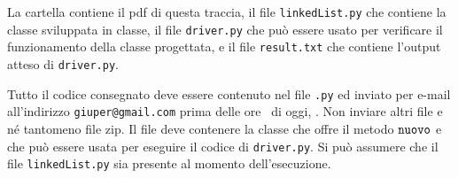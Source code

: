 \documentclass{amsart}
\begin{document}
\medskip{}
La cartella contiene il pdf di questa traccia, il file
{\tt linkedList.py} che contiene la classe sviluppata in classe,
il file {\tt driver.py} che pu\`o essere usato
per verificare il funzionamento della classe progettata, e il file  {\tt result.txt} che contiene
l'output atteso di {\tt driver.py}.

\medskip{}
Tutto il codice consegnato deve essere contenuto nel file
{\tt \nomeClasse .py} ed inviato per e-mail all'indirizzo
{\tt giuper@gmail.com} prima delle ore \oraconsegna\ di oggi, 
\dataoggi. Non inviare altri file e n\'e tantomeno file zip.
Il file deve contenere la classe {\tt \nomeClasse}  
che offre il metodo ${\tt{nuovo}}$ e che pu\`o essere usata per eseguire
il codice di {\tt driver.py}. Si pu\`o assumere che il file
{\tt linkedList.py} sia presente al momento dell'esecuzione. 
\end{document}
